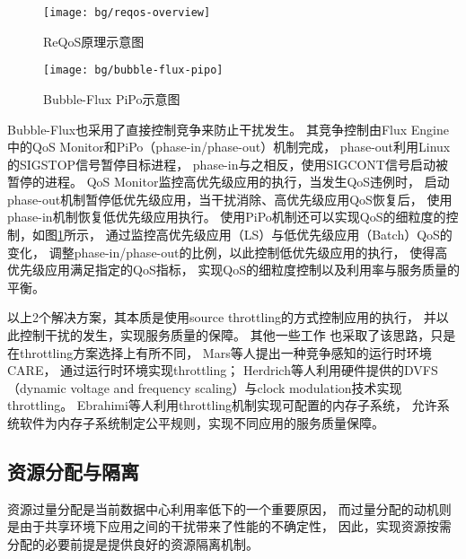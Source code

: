 \begin{figure}[tb]
\begin{minipage}[b]{0.42\textwidth}
  \centering
  \texttt{[image: bg/reqos-overview]}
  \caption{ReQoS原理示意图\cite{tang_reqos:_2013}}
  \label{fig:reqos-overview}
\end{minipage}\hfill
\begin{minipage}[b]{0.55\textwidth}
  \centering
  \texttt{[image: bg/bubble-flux-pipo]}
  \caption{Bubble-Flux PiPo示意图\cite{yang_bubble-flux:_2013}}
  \label{fig:bubble-flux-pipo}
\end{minipage}
\end{figure}

Bubble-Flux\cite{yang_bubble-flux:_2013}也采用了直接控制竞争来防止干扰发生。
其竞争控制由Flux Engine中的QoS Monitor和PiPo（phase-in/phase-out）机制完成，
phase-out利用Linux的SIGSTOP信号暂停目标进程，
phase-in与之相反，使用SIGCONT信号启动被暂停的进程。
QoS Monitor监控高优先级应用的执行，当发生QoS违例时，
启动phase-out机制暂停低优先级应用，当干扰消除、高优先级应用QoS恢复后，
使用phase-in机制恢复低优先级应用执行。
使用PiPo机制还可以实现QoS的细粒度的控制，如图\ref{fig:bubble-flux-pipo}所示，
通过监控高优先级应用（LS）与低优先级应用（Batch）QoS的变化，
调整phase-in/phase-out的比例，以此控制低优先级应用的执行，
使得高优先级应用满足指定的QoS指标，
实现QoS的细粒度控制以及利用率与服务质量的平衡。

以上2个解决方案，其本质是使用source throttling的方式控制应用的执行，
并以此控制干扰的发生，实现服务质量的保障。
其他一些工作\cite{mars_contention_2010, herdrich_rate-based_2009, ebrahimi:2010}
也采取了该思路，只是在throttling方案选择上有所不同，
Mars等人\cite{mars_contention_2010}提出一种竞争感知的运行时环境CARE，
通过运行时环境实现throttling；
Herdrich等人\cite{herdrich_rate-based_2009}利用硬件提供的DVFS
（dynamic voltage and frequency scaling）与clock modulation技术实现throttling。
Ebrahimi等人\cite{ebrahimi:2010}利用throttling机制实现可配置的内存子系统，
允许系统软件为内存子系统制定公平规则，实现不同应用的服务质量保障。


\subsection{资源分配与隔离}

资源过量分配是当前数据中心利用率低下的一个重要原因，
而过量分配的动机则是由于共享环境下应用之间的干扰带来了性能的不确定性，
因此，实现资源按需分配的必要前提是提供良好的资源隔离机制。

